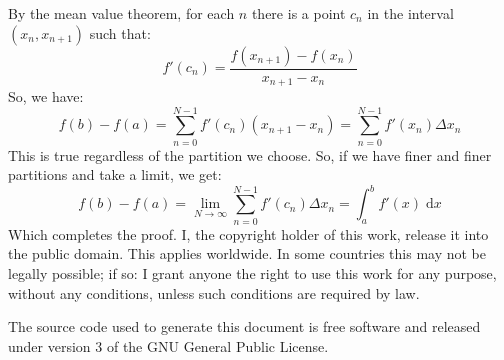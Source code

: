 \documentclass{article}
\begin{document}
    By the mean value theorem, for each $n$ there is a point $c_{n}$ in the
    interval $(x_{n},x_{n+1})$ such that:
    \begin{equation}
        f'(c_{n})=\frac{f(x_{n+1})-f(x_{n})}{x_{n+1}-x_{n}}
    \end{equation}
    So, we have:
    \begin{equation}
        f(b)-f(a)=\sum_{n=0}^{N-1}f'(c_{n})(x_{n+1}-x_{n})
            =\sum_{n=0}^{N-1}f'(x_{n})\Delta{x}_{n}
    \end{equation}
    This is true regardless of the partition we choose. So, if we have finer
    and finer partitions and take a limit, we get:
    \begin{equation}
        f(b)-f(a)=\lim_{N\rightarrow\infty}
            \sum_{n=0}^{N-1}f'(c_{n})\Delta{x}_{n}
            =\int_{a}^{b}f'(x)\;\textrm{d}x
    \end{equation}
    Which completes the proof.
    \newpage
    I, the copyright holder of this work, release it into the public domain.
    This applies worldwide. In some countries this may not be legally possible;
    if so: I grant anyone the right to use this work for any purpose, without
    any conditions, unless such conditions are required by law.
    \par\hfill\par
    The source code used to generate this document is free software and released
    under version 3 of the GNU General Public License.
\end{document}
